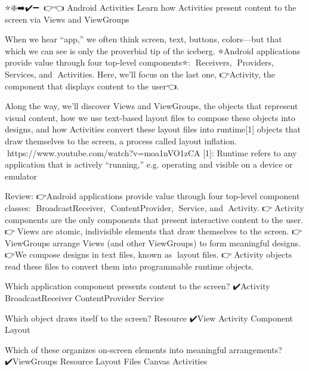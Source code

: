 ⭐❇️➡️✔️➖🔗💎👉👈
Android Activities
                Learn how Activities present content to the screen via Views and ViewGroups

                When we hear “app,” we often think screen, text, buttons, colors—but that which we can see is only the proverbial tip of the iceberg. ⭐Android applications provide value through four top-level components⭐: 💎Receivers, 💎Providers, 💎Services, and 💎Activities. Here, we’ll focus on the last one, 👉Activity, the component that displays content to the user👈.

                Along the way, we’ll discover Views and ViewGroups, the objects that represent visual content, how we use text-based layout files to compose these objects into designs, and how Activities convert these layout files into runtime[1] objects that draw themselves to the screen, a process called layout inflation.
                        🔗https://www.youtube.com/watch?v=moa1nVO1zCA
                        [1]: Runtime refers to any application that is actively “running,” e.g. operating and visible on a device or emulator

                Review:
                        👉Android applications provide value through four top-level component classes: 💎BroadcastReceiver, 💎ContentProvider, 💎Service, and 💎Activity.
                        👉💎Activity components are the only components that present interactive content to the user.
                        👉💎Views are atomic, indivisible elements that draw themselves to the screen.
                        👉💎ViewGroups arrange Views (and other ViewGroups) to form meaningful designs.
                        👉We compose designs in text files, known as 💎layout files.
                        👉💎Activity objects read these files to convert them into programmable runtime objects.

                Which application component presents content to the screen?
                        ✔️Activity
                        BroadcastReceiver
                        ContentProvider
                        Service

                Which object draws itself to the screen?
                        Resource
                        ✔️View
                        Activity
                        Component
                        Layout

                Which of these organizes on-screen elements into meaningful arrangements?
                        ✔️ViewGroups
                        Resource
                        Layout Files
                        Canvas
                        Activities